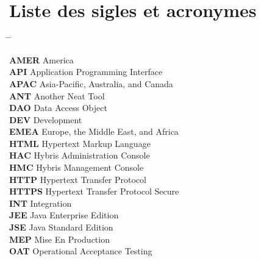 \chapter{Liste des sigles et acronymes}

\begin{tabbing}
    \hspace{3cm} \= \hspace{7cm} \= \kill

    \textbf{AMER} \> America \\

    \textbf{API} \> Application Programming Interface \\

    \textbf{APAC} \> Asia-Pacific, Australia, and Canada \\

    \textbf{ANT} \> Another Neat Tool \\

    \textbf{DAO} \> Data Access Object \\

    \textbf{DEV} \> Development \\

    \textbf{EMEA} \> Europe, the Middle East, and Africa \\

    \textbf{HTML} \> Hypertext Markup Language \\

    \textbf{HAC} \> Hybris Administration Console \\

    \textbf{HMC} \> Hybris Management Console \\

    \textbf{HTTP} \> Hypertext Transfer Protocol \\

    \textbf{HTTPS} \> Hypertext Transfer Protocol Secure \\

    \textbf{INT} \> Integration \\

    \textbf{JEE} \> Java Enterprise Edition \\

    \textbf{JSE} \> Java Standard Edition \\

    \textbf{MEP} \> Mise En Production \\
    
    \textbf{OAT} \> Operational Acceptance Testing \\


\end{tabbing}
